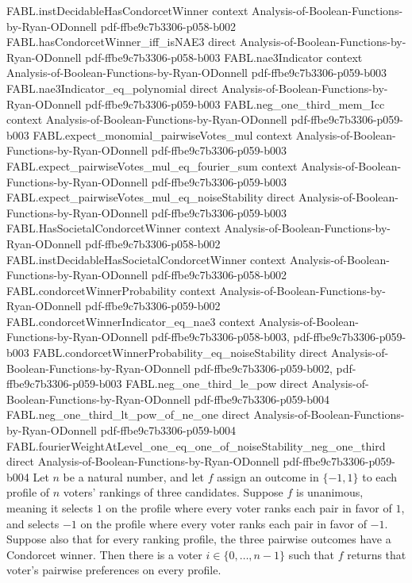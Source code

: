 \begin{theorem}
\proofstep
  {FABL.instDecidableHasCondorcetWinner}
  {context}
  {Analysis-of-Boolean-Functions-by-Ryan-ODonnell}
  {pdf-ffbe9c7b3306-p058-b002}
\proofstep
  {FABL.hasCondorcetWinner_iff_isNAE3}
  {direct}
  {Analysis-of-Boolean-Functions-by-Ryan-ODonnell}
  {pdf-ffbe9c7b3306-p058-b003}
\proofstep
  {FABL.nae3Indicator}
  {context}
  {Analysis-of-Boolean-Functions-by-Ryan-ODonnell}
  {pdf-ffbe9c7b3306-p059-b003}
\proofstep
  {FABL.nae3Indicator_eq_polynomial}
  {direct}
  {Analysis-of-Boolean-Functions-by-Ryan-ODonnell}
  {pdf-ffbe9c7b3306-p059-b003}
\proofstep
  {FABL.neg_one_third_mem_Icc}
  {context}
  {Analysis-of-Boolean-Functions-by-Ryan-ODonnell}
  {pdf-ffbe9c7b3306-p059-b003}
\proofstep
  {FABL.expect_monomial_pairwiseVotes_mul}
  {context}
  {Analysis-of-Boolean-Functions-by-Ryan-ODonnell}
  {pdf-ffbe9c7b3306-p059-b003}
\proofstep
  {FABL.expect_pairwiseVotes_mul_eq_fourier_sum}
  {context}
  {Analysis-of-Boolean-Functions-by-Ryan-ODonnell}
  {pdf-ffbe9c7b3306-p059-b003}
\proofstep
  {FABL.expect_pairwiseVotes_mul_eq_noiseStability}
  {direct}
  {Analysis-of-Boolean-Functions-by-Ryan-ODonnell}
  {pdf-ffbe9c7b3306-p059-b003}
\proofstep
  {FABL.HasSocietalCondorcetWinner}
  {context}
  {Analysis-of-Boolean-Functions-by-Ryan-ODonnell}
  {pdf-ffbe9c7b3306-p058-b002}
\proofstep
  {FABL.instDecidableHasSocietalCondorcetWinner}
  {context}
  {Analysis-of-Boolean-Functions-by-Ryan-ODonnell}
  {pdf-ffbe9c7b3306-p058-b002}
\proofstep
  {FABL.condorcetWinnerProbability}
  {context}
  {Analysis-of-Boolean-Functions-by-Ryan-ODonnell}
  {pdf-ffbe9c7b3306-p059-b002}
\proofstep
  {FABL.condorcetWinnerIndicator_eq_nae3}
  {context}
  {Analysis-of-Boolean-Functions-by-Ryan-ODonnell}
  {pdf-ffbe9c7b3306-p058-b003,
    pdf-ffbe9c7b3306-p059-b003}
\proofstep
  {FABL.condorcetWinnerProbability_eq_noiseStability}
  {direct}
  {Analysis-of-Boolean-Functions-by-Ryan-ODonnell}
  {pdf-ffbe9c7b3306-p059-b002,
    pdf-ffbe9c7b3306-p059-b003}
\proofstep
  {FABL.neg_one_third_le_pow}
  {direct}
  {Analysis-of-Boolean-Functions-by-Ryan-ODonnell}
  {pdf-ffbe9c7b3306-p059-b004}
\proofstep
  {FABL.neg_one_third_lt_pow_of_ne_one}
  {direct}
  {Analysis-of-Boolean-Functions-by-Ryan-ODonnell}
  {pdf-ffbe9c7b3306-p059-b004}
\proofstep
  {FABL.fourierWeightAtLevel_one_eq_one_of_noiseStability_neg_one_third}
  {direct}
  {Analysis-of-Boolean-Functions-by-Ryan-ODonnell}
  {pdf-ffbe9c7b3306-p059-b004}
Let $n$ be a natural number, and let $f$ assign an outcome in $\{-1,1\}$ to each profile
of $n$ voters’ rankings of three candidates. Suppose $f$ is unanimous, meaning it
selects $1$ on the profile where every voter ranks each pair in favor of $1$, and
selects $-1$ on the profile where every voter ranks each pair in favor of $-1$. Suppose
also that for every ranking profile, the three pairwise outcomes have a Condorcet
winner. Then there is a voter $i\in\{0,\ldots,n-1\}$ such that $f$ returns that voter’s
pairwise preferences on every profile.
\end{theorem}

